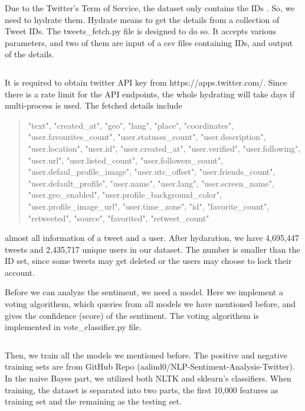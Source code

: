 \documentclass[12pt,a4paper]{report}
\begin{document}
      Due to the Twitter's Term of Service, the dataset only contains the IDs \cite{twitter_2018}. So, we need to hydrate them. Hydrate means to get the details from a collection of Tweet IDs. The tweets_fetch.py file is designed to do so. It accepts various parameters, and two of them are input of a csv files containing IDs, and output of the details.

      \inputminted[mathescape, linenos, numbersep=5pt, frame=lines, framesep=2mm, breaklines]{python}{../tweets_fetch.py}

      It is required to obtain twitter API key from https://apps.twitter.com/. Since there is a rate limit for the API endpoints, the whole hydrating will take days if multi-process is used. The fetched details include

      \begin{quotation}
        "text", "created\_at", "geo", "lang", "place", "coordinates", "user.favourites\_count", "user.statuses\_count", "user.description", "user.location", "user.id", "user.created\_at", "user.verified", "user.following", "user.url", "user.listed\_count", "user.followers\_count", "user.defaul_profile\_image", "user.utc\_offset", "user.friends\_count", "user.default\_profile", "user.name", "user.lang", "user.screen\_name", "user.geo\_enabled", "user.profile_background_color", "user.profile\_image\_url", "user.time\_zone", "id", "favorite\_count", "retweeted", "source", "favorited", "retweet\_count"
      \end{quotation}

      almost all information of a tweet and a user. After hydaration, we have 4,695,447 tweets and 2,435,717 unique users in our dataset. The number is smaller than the ID set, since some tweets may get deleted or the users may choose to lock their account.

      Before we can analyze the sentiment, we need a model. Here we implement a voting algorithem, which queries from all models we have mentioned before, and gives the confidence (score) of the sentiment. The voting algorithem is implemented in vote\_classifier.py file.

      \inputminted[mathescape, linenos, numbersep=5pt, frame=lines, framesep=2mm, breaklines]{python}{../vote_classifier.py}

      Then, we train all the models we mentioned before. The positive and negative training sets are from GitHub Repo (aalind0/NLP-Sentiment-Analysis-Twitter). In the naive Bayes part, we utilized both NLTK and sklearn's classifiers. When training, the dataset is separated into two parts, the first 10,000 features as training set and the remaining as the testing set.
\end{document}
